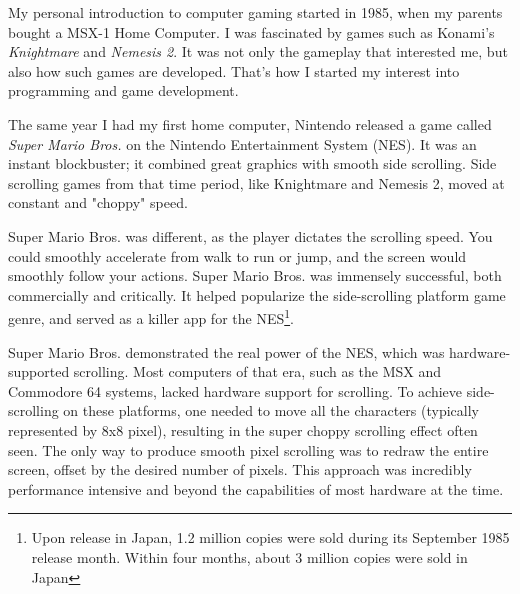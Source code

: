 \documentclass[book.tex]{subfiles}
\begin{document}
My personal introduction to computer gaming started in 1985, when my parents bought a MSX-1 Home Computer. I was fascinated by games such as Konami's \textit{Knightmare} and \textit{Nemesis 2}. It was not only the gameplay that interested me, but also how such games are developed. That's how I started my interest into programming and game development.\\
\par
The same year I had my first home computer, Nintendo released a game called \textit{Super Mario Bros.} on the Nintendo Entertainment System (NES). It was an instant blockbuster; it combined great graphics with smooth side scrolling. Side scrolling games from that time period, like Knightmare and Nemesis 2, moved at constant and "choppy" speed. \\

\par
Super Mario Bros. was different, as the player dictates the scrolling speed. You could smoothly accelerate from walk to run or jump, and the screen would smoothly follow your actions. Super Mario Bros. was immensely successful, both commercially and critically. It helped popularize the side-scrolling platform game genre, and served as a killer app for the NES\footnote{Upon release in Japan, 1.2 million copies were sold during its September 1985 release month. Within four months, about 3 million copies were sold in Japan}.\\

\par
Super Mario Bros. demonstrated the real power of the NES, which was hardware-supported scrolling. Most computers of that era, such as the MSX and Commodore 64 systems, lacked hardware support for scrolling. To achieve side-scrolling on these platforms, one needed to move all the characters (typically represented by 8x8 pixel), resulting in the super choppy scrolling effect often seen. The only way to produce smooth pixel scrolling was to redraw the entire screen, offset by the desired number of pixels. This approach was incredibly performance intensive and beyond the capabilities of most hardware at the time.\\
\end{document}
